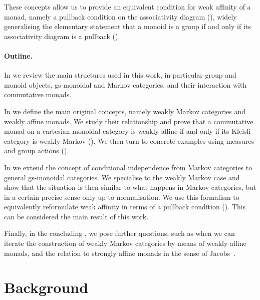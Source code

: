 \documentclass[a4paper,UKenglish,numberwithinsect,cleveref, autoref, thm-restate]{lipics-v2021}
\theoremstyle{plain} %
\theoremstyle{definition} %
\begin{document}
These concepts allow us to provide an equivalent condition for weak affinity of a monad, namely a pullback condition on the associativity diagram (), widely generalising the elementary statement that a monoid is a group if and only if its associativity diagram is a pullback (). 


\paragraph*{Outline.}
In  we review the main structures used in this work, in particular group and monoid objects, gs-monoidal and Markov categories, and their interaction with commutative monads.

In  we define the main original concepts, namely weakly Markov categories and weakly affine monads. We study their relationship and prove that a commutative monad on a cartesian monoidal category is weakly affine if and only if its Kleisli category is weakly Markov ().
We then turn to concrete examples using measures and group actions ().

In  we extend the concept of conditional independence from Markov categories to general gs-monoidal categories. We specialise to the weakly Markov case and show that the situation is then similar to what happens in Markov categories, but in a certain precise sense only up to normalisation.
We use this formalism to equivalently reformulate weak affinity in terms of a pullback condition (). This can be considered the main result of this work.

Finally, in the concluding , we pose further questions, such as when we can iterate the construction of weakly Markov categories by means of weakly affine monads, and the relation to strongly affine monads in the sense of Jacobs~\cite{Jacobs16}.


\section{Background}
\label{secbackground}
\end{document}
